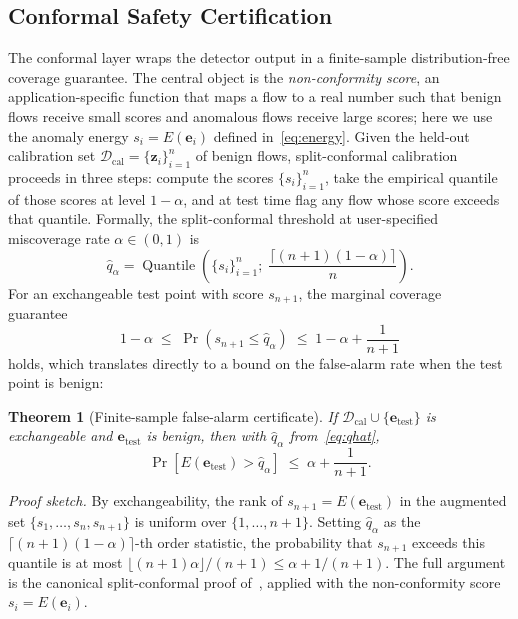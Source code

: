 \documentclass{ieeeaccess}
\newtheorem{theorem}{Theorem}
\DeclareMathOperator{\Quantile}{Quantile}
\begin{document}
\subsection{Conformal Safety Certification}
\label{sec:method:certify}
The conformal layer wraps the detector output in a finite-sample
distribution-free coverage guarantee. The central object is the
\emph{non-conformity score}, an application-specific function that maps a
flow to a real number such that benign flows receive small scores and
anomalous flows receive large scores; here we use the anomaly energy
$s_i = E(\mathbf{e}_i)$ defined in~\eqref{eq:energy}. Given the held-out
calibration set $\mathcal{D}_\text{cal} = \{\mathbf{z}_i\}_{i=1}^n$ of
benign flows, split-conformal calibration proceeds in three steps:
compute the scores $\{s_i\}_{i=1}^n$, take the empirical quantile of
those scores at level $1-\alpha$, and at test time flag any flow whose
score exceeds that quantile. Formally, the split-conformal threshold at
user-specified miscoverage rate $\alpha \in (0,1)$ is
\begin{equation}
\hat{q}_\alpha = \Quantile\!\left(\{s_i\}_{i=1}^n;\; \frac{\lceil(n+1)(1-\alpha)\rceil}{n}\right).
\label{eq:qhat}
\end{equation}
For an exchangeable test point with score $s_{n+1}$, the marginal
coverage guarantee~\cite{vovk2022alrw,angelopoulos2023gentle}
\begin{equation}
1 - \alpha \;\le\; \Pr(s_{n+1} \le \hat{q}_\alpha) \;\le\; 1 - \alpha + \frac{1}{n+1}
\label{eq:cpguarantee}
\end{equation}
holds, which translates directly to a bound on the false-alarm rate when
the test point is benign:

\begin{theorem}[Finite-sample false-alarm certificate]
\label{thm:far}
If $\mathcal{D}_\text{cal} \cup \{\mathbf{e}_\text{test}\}$ is exchangeable
and $\mathbf{e}_\text{test}$ is benign, then with $\hat{q}_\alpha$
from~\eqref{eq:qhat},
\begin{equation}
\Pr\!\left[E(\mathbf{e}_\text{test}) > \hat{q}_\alpha\right] \;\le\; \alpha + \frac{1}{n+1}.
\end{equation}
\end{theorem}

\smallskip\noindent\textit{Proof sketch.}
By exchangeability, the rank of $s_{n+1} = E(\mathbf{e}_\text{test})$ in
the augmented set $\{s_1,\dots,s_n,s_{n+1}\}$ is uniform over
$\{1,\dots,n+1\}$. Setting $\hat{q}_\alpha$ as the
$\lceil(n+1)(1-\alpha)\rceil$-th order statistic, the probability that
$s_{n+1}$ exceeds this quantile is at most
$\lfloor(n+1)\alpha\rfloor/(n+1) \le \alpha + 1/(n+1)$. The full argument
is the canonical split-conformal proof
of~\cite{vovk2022alrw,angelopoulos2023gentle}, applied with the
non-conformity score $s_i = E(\mathbf{e}_i)$.\smallskip
\end{document}
